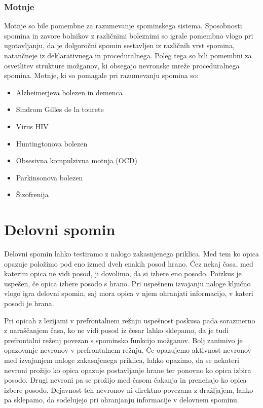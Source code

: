 \documentclass[10pt,a4paper]{article}
\begin{document}
\subsubsection{Motnje}
Motnje so bile pomembne za razumevanje spominskega sistema. Sposobnosti spomina in zavore bolnikov z različnimi boleznimi so igrale pomembno vlogo pri ugotavljanju, da je dolgoročni spomin sestavljen iz različnih vrst spomina, natančneje iz deklarativnega in proceduralnega. Poleg tega so bili pomembni za osvetlitev strukture možganov, ki obsegajo nevronske mreže proceduralnega spomina.
Motnje, ki so pomagale pri razumevanju spomina so: 
\begin{itemize}
\item Alzheimerjeva bolezen in demenca
\item Sindrom Gilles de la tourete
\item Virus HIV
\item Huntingtonova bolezen
\item Obsesivna kompulzivna motnja (OCD)
\item Parkinsonova bolezen
\item Šizofrenija
\end{itemize}


\section{Delovni spomin}
Delovni spomin lahko testiramo z nalogo zakasnjenega priklica. Med tem ko opica opazuje položimo pod eno izmed dveh enakih posod hrano. Čez nekaj časa, med katerim opica ne vidi posod, ji dovolimo, da si izbere eno posodo. Poizkus je uspešen, če opica izbere posodo s hrano. Pri uspešnem izvajanju naloge ključno vlogo igra delovni spomin, saj mora opica v njem ohranjati informacijo, v kateri posodi je hrana.

Pri opicah z lezijami v prefrontalnem režnju uspešnost poskusa pada sorazmerno z naraščanjem časa, ko ne vidi posod iz česar lahko sklepamo, da je tudi prefrontalni reženj povezan s spominsko funkcijo možganov. Bolj zanimivo je opazovanje nevronov v prefrontalnem režnju. Če opazujemo aktivnost nevronov med izvajanjem naloge zakasnjenega priklica, lahko opazimo, da se nekateri nevroni prožijo ko opica opazuje postavljanje hrane ter ponovno ko opica izbira posodo. Drugi nevroni pa se prožijo med časom čakanja in prenehajo ko opica izbere posodo. Dejavnost teh nevronov ni direktno povezana z dražljajem, lahko pa sklepamo, da sodelujejo pri ohranjanju informacije v delovnem spominu.
\end{document}
